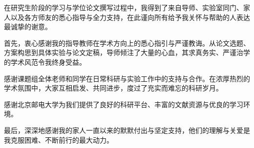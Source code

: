
\begin{acknowledgement}
在研究生阶段的学习与学位论文撰写过程中，我得到了来自导师、实验室同门、家人以及各方师友的悉心指导与全力支持，在此谨向所有给予我关怀与帮助的人表达最诚挚的谢意。

首先，衷心感谢我的指导教师在学术方向上的悉心指引与严谨教诲。从论文选题、方案构思到具体实验与论文定稿，导师倾注了大量的心血，其求真务实、严谨治学的学术风范令我终身受益。

感谢课题组全体老师和同学在日常科研与实验工作中的支持与合作。在浓厚热烈的学术氛围中，大家互相启发、共同进步，度过了充实而难忘的科研岁月。

感谢北京邮电大学为我们提供了良好的科研平台、丰富的文献资源与优良的学习环境。

最后，深深地感谢我的家人一直以来的默默付出与坚定支持，他们的理解与关爱是我克服困难、不断前行的最大动力。
\end{acknowledgement}
